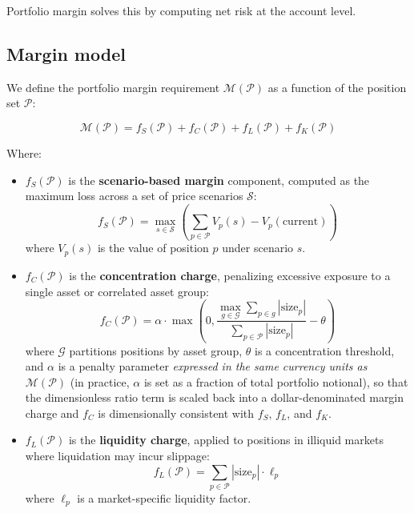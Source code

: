 \documentclass[11pt,a4paper]{article}
\begin{document}
Portfolio margin solves this by computing net risk at the account level.

\subsection{Margin model}

We define the portfolio margin requirement $\mathcal{M}(\mathcal{P})$ as a function of the position set $\mathcal{P}$:

\[
\mathcal{M}(\mathcal{P}) = f_S(\mathcal{P}) + f_C(\mathcal{P}) + f_L(\mathcal{P}) + f_K(\mathcal{P})
\]

Where:
\begin{itemize}
  \item $f_S(\mathcal{P})$ is the \textbf{scenario-based margin} component, computed as the maximum loss across a set of price scenarios $\mathcal{S}$:
  \[
  f_S(\mathcal{P}) = \max_{s \in \mathcal{S}} \left( \sum_{p \in \mathcal{P}} V_p(s) - V_p(\text{current}) \right)
  \]
  where $V_p(s)$ is the value of position $p$ under scenario $s$.

  \item $f_C(\mathcal{P})$ is the \textbf{concentration charge}, penalizing excessive exposure to a single asset or correlated asset group:
  \[
  f_C(\mathcal{P}) = \alpha \cdot \max\left(0, \frac{\max_{g \in \mathcal{G}} \sum_{p \in g} |\text{size}_p|}{\sum_{p \in \mathcal{P}} |\text{size}_p|} - \theta\right)
  \]
  where $\mathcal{G}$ partitions positions by asset group, $\theta$ is a concentration threshold, and $\alpha$ is a penalty parameter \emph{expressed in the same currency units as} $\mathcal{M}(\mathcal{P})$ (in practice, $\alpha$ is set as a fraction of total portfolio notional), so that the dimensionless ratio term is scaled back into a dollar-denominated margin charge and $f_C$ is dimensionally consistent with $f_S$, $f_L$, and $f_K$.

  \item $f_L(\mathcal{P})$ is the \textbf{liquidity charge}, applied to positions in illiquid markets where liquidation may incur slippage:
  \[
  f_L(\mathcal{P}) = \sum_{p \in \mathcal{P}} |\text{size}_p| \cdot \ell_p
  \]
  where $\ell_p$ is a market-specific liquidity factor.


\end{itemize}
\end{document}
